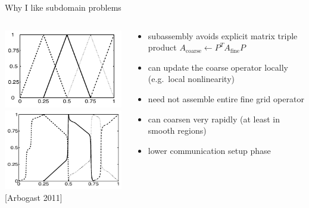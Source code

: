 \documentclass{beamer}
\begin{document}
\begin{frame}{Why I like subdomain problems}
  \begin{columns}
    \begin{column}{0.4\textwidth}
      \includegraphics[width=\textwidth]{figures/ArbogastCoarse} \\
      \includegraphics[width=\textwidth]{figures/ArbogastCoarseMs} \\
      {\small [Arbogast 2011]}
    \end{column}
    \begin{column}{0.6\textwidth}
  \begin{itemize}
  \item subassembly avoids explicit matrix triple product $A_{\text{coarse}} \gets P^T A_{\text{fine}} P$
  \item can update the coarse operator locally (e.g.~local nonlinearity)
  \item need not assemble entire fine grid operator
  \item can coarsen very rapidly (at least in smooth regions)
  \item lower communication setup phase
  \end{itemize}      
    \end{column}
  \end{columns}
\end{frame}
\end{document}
